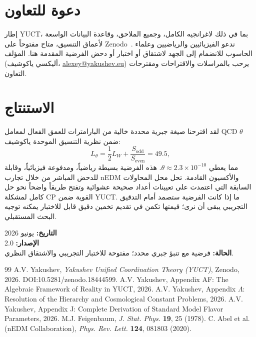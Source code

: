 \documentclass[12pt,a4paper]{article}
\begin{document}
	\section{دعوة للتعاون}
	\label{sec:invite}
	
	إطار YUCT، بما في ذلك لاغرانجيه الكامل، وجميع الملاحق، وقاعدة البيانات الواسعة لأعماق التنسيق، متاح مفتوحاً على Zenodo~\cite{Y1,Y2}. ندعو الفيزيائيين والرياضيين وعلماء الحاسوب للانضمام إلى الجهد لاشتقاق أو اختبار أو دحض الفرضية المقدمة هنا. المؤلف (أليكسي ياكوشيف، \href{mailto:alexey@yakushev.eu}{alexey@yakushev.eu}) يرحب بالمراسلات والاقتراحات ومقترحات التعاون.
	
	\section{الاستنتاج}
	\label{sec:conclusion}
	
	لقد اقترحنا صيغة جبرية محددة خالية من البارامترات للعمق الفعال لمعامل QCD \(\theta\) ضمن نظرية التنسيق الموحدة ياكوشيف:
	\[
	L_\theta = \frac{1}{2}L_W + \frac{S_{\mathrm{odd}}}{S_{\mathrm{even}}} = 49.5,
	\]
	مما يعطي \(\theta \approx 2.3 \times 10^{-10}\). هذه الفرضية بسيطة رياضياً، ومدفوعة فيزيائياً، وقابلة للدحض المباشر من خلال تجارب nEDM والأكسيون القادمة. تحل محل المحاولات السابقة التي اعتمدت على تعيينات أعداد صحيحة عشوائية وتفتح طريقاً واضحاً نحو حل كامل لمشكلة CP القوية ضمن YUCT. ما إذا كانت الفرضية ستصمد أمام التدقيق التجريبي يبقى أن نرى؛ قيمتها تكمن في تقديم تخمين دقيق قابل للاختبار يمكنه توجيه البحث المستقبلي.
	
	\vspace{1cm}
	\noindent\textbf{التاريخ:} يونيو 2026\\
	\textbf{الإصدار:} 2.0\\
	\textbf{الحالة:} فرضية مع تنبؤ جبري محدد؛ مفتوحة للاختبار التجريبي والاشتقاق النظري.
	
	\newpage
	\begin{thebibliography}{99}
		 A.V. Yakushev, \textit{Yakushev Unified Coordination Theory (YUCT)}, Zenodo, 2026. DOI:10.5281/zenodo.18444599.
		 A.V. Yakushev, Appendix AF: The Algebraic Framework of Reality in YUCT, 2026.
		 A.V. Yakushev, Appendix \(\Lambda\): Resolution of the Hierarchy and Cosmological Constant Problems, 2026.
		 A.V. Yakushev, Appendix J: Complete Derivation of Standard Model Flavor Parameters, 2026.
		 M.J. Feigenbaum, \textit{J. Stat. Phys.} \textbf{19}, 25 (1978).
		 C. Abel et al. (nEDM Collaboration), \textit{Phys. Rev. Lett.} \textbf{124}, 081803 (2020).
	\end{thebibliography}
	
\end{document}
